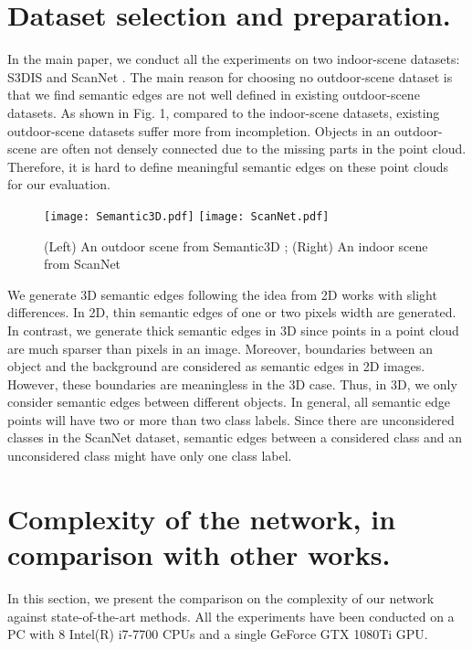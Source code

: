 \documentclass[runningheads]{llncs}
\begin{document}
\section{Dataset selection and preparation.}\label{dataset}
In the main paper, we conduct all the experiments on two indoor-scene datasets: S3DIS \cite{armeni_cvpr16} and ScanNet \cite{dai2017scannet}. The main reason for choosing no outdoor-scene dataset is that we find semantic edges are not well defined in existing outdoor-scene datasets. As shown in Fig. 1, compared to the indoor-scene datasets, existing outdoor-scene datasets suffer more from incompletion. Objects in an outdoor-scene are often not densely connected due to the missing parts in the point cloud. Therefore, it is hard to define meaningful semantic edges on these point clouds for our evaluation.

\begin{figure}[htp]

\centering
\texttt{[image: Semantic3D.pdf]}\hfil
\texttt{[image: ScanNet.pdf]}

\caption{(Left) An outdoor scene from Semantic3D \cite{hackel2017isprs}; (Right) An indoor scene from ScanNet \cite{dai2017scannet} }

\end{figure}

We generate 3D semantic edges following the idea from 2D works \cite{yu2017casenet,prasad2006learning} with slight differences. In 2D, thin semantic edges of one or two pixels width are generated. In contrast, we generate thick semantic edges in 3D since points in a point cloud are much sparser than pixels in an image. Moreover, boundaries between an object and the background are considered as semantic edges in 2D images. However, these boundaries are meaningless in the 3D case. Thus, in 3D, we only consider semantic edges between different objects. In general, all semantic edge points will have two or more than two class labels. Since there are unconsidered classes in the ScanNet dataset, semantic edges between a considered class and an unconsidered class might have only one class label.



\section{Complexity of the network, in comparison with other works.}\label{complexity}

In this section, we present the comparison on the complexity of our network against state-of-the-art methods. All the experiments have been conducted on a PC with 8 Intel(R) i7-7700 CPUs and a single GeForce GTX 1080Ti GPU.
\end{document}

